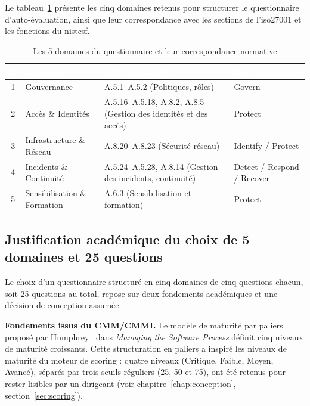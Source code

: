 Le tableau~\ref{tab:domaines} présente les cinq domaines retenus pour structurer le questionnaire d'auto-évaluation, ainsi que leur correspondance avec les sections de l'\gls{iso27001} et les fonctions du \gls{nistcsf}.

\begin{table}[H]
  \centering
  \caption{Les 5 domaines du questionnaire et leur correspondance normative}
  \label{tab:domaines}
  \renewcommand{\arraystretch}{1.4}
  \begin{tabularx}{\textwidth}{|c|>{\raggedright\arraybackslash}p{3.1cm}|>{\raggedright\arraybackslash}X|>{\raggedright\arraybackslash}p{3cm}|}
    \hline
    \rowcolor{iacsTableHead}
    \textcolor{white}{\textbf{\#}} &
    \textcolor{white}{\textbf{Domaine}} &
    \textcolor{white}{\textbf{Réf.\ ISO 27001}} &
    \textcolor{white}{\textbf{Réf.\ NIST CSF}} \\
    \hline
    1 & Gouvernance & A.5.1--A.5.2 (Politiques, rôles) & Govern \\
    \hline
    \rowcolor{iacsLightGray}
    2 & Accès \& Identités & A.5.16--A.5.18, A.8.2, A.8.5 (Gestion des identités et des accès) & Protect \\
    \hline
    3 & Infrastructure \& Réseau & A.8.20--A.8.23 (Sécurité réseau) & Identify / Protect \\
    \hline
    \rowcolor{iacsLightGray}
    4 & Incidents \& Continuité & A.5.24--A.5.28, A.8.14 (Gestion des incidents, continuité) & Detect / Respond / Recover \\
    \hline
    5 & Sensibilisation \& Formation & A.6.3 (Sensibilisation et formation) & Protect \\
    \hline
  \end{tabularx}
\end{table}

\subsection{Justification académique du choix de 5 domaines et 25 questions}

\hspace{1cm}Le choix d'un questionnaire structuré en cinq domaines de cinq questions chacun, soit 25 questions au total, repose sur deux fondements académiques et une décision de conception assumée.

\textbf{Fondements issus du CMM/CMMI.} Le modèle de maturité par paliers proposé par Humphrey~\cite{humphrey1989} dans \textit{Managing the Software Process} définit cinq niveaux de maturité croissants. Cette structuration en paliers a inspiré les niveaux de maturité du moteur de scoring : quatre niveaux (Critique, Faible, Moyen, Avancé), séparés par trois seuils réguliers (25, 50 et 75), ont été retenus pour rester lisibles par un dirigeant (voir chapitre~\ref{chap:conception}, section~\ref{sec:scoring}).


